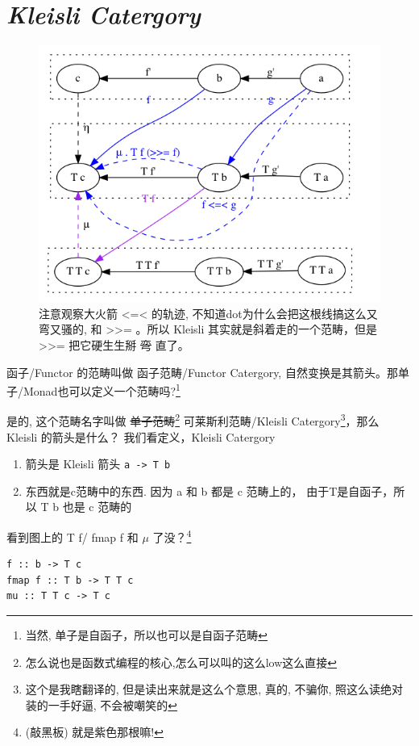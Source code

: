 \documentclass[11pt]{tufte-book}
\begin{document}
\chapter{\emph{Kleisli Catergory}}
\label{sec:orgab35996}

\begin{figure}[htbp]
\centering
\includegraphics[width=.9\linewidth]{images/kleisli.png}
\caption{注意观察大火箭 <=< 的轨迹, 不知道dot为什么会把这根线搞这么又弯又骚的, 和 >>= 。所以 Kleisli 其实就是斜着走的一个范畴，但是 >>= 把它硬生生掰 \sout{弯} 直了。}
\end{figure}

函子/Functor 的范畴叫做 函子范畴/Functor Catergory, 自然变换是其箭头。那单子/Monad也可以定义一个范畴吗?\footnote{当然, 单子是自函子，所以也可以是自函子范畴}

是的, 这个范畴名字叫做 \sout{单子范畴}\footnote{怎么说也是函数式编程的核心,怎么可以叫的这么low这么直接} 可莱斯利范畴/Kleisli Catergory\footnote{这个是我瞎翻译的, 但是读出来就是这么个意思, 真的, 不骗你, 照这么读绝对装的一手好逼, 不会被嘲笑的}，那么 Kleisli 的箭头是什么？
我们看定义，Kleisli Catergory

\begin{enumerate}
\item 箭头是 Kleisli 箭头 \texttt{a -> T b}
\item 东西就是c范畴中的东西. 因为 a 和 b 都是 c 范畴上的， 由于T是自函子，所以 T b 也是 c 范畴的
\end{enumerate}

看到图上的 T f/ fmap f 和 \(\mu\) 了没？\footnote{(敲黑板) 就是紫色那根嘛!}

\begin{verbatim}
f :: b -> T c
fmap f :: T b -> T T c
mu :: T T c -> T c
\end{verbatim}
\end{document}
